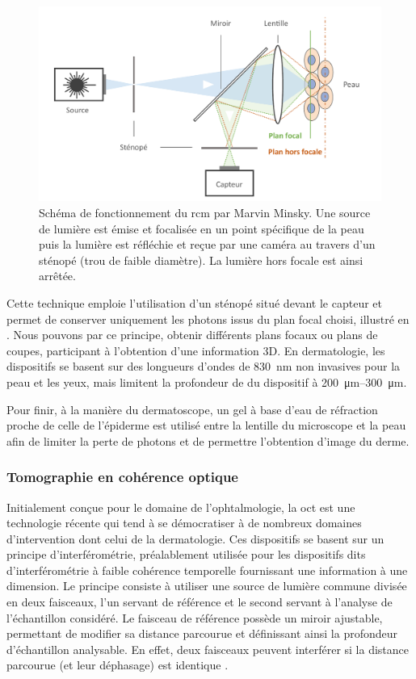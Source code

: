 \begin{figure}[H]
\centering
    \includegraphics[width=0.85\linewidth]{contents/chapter_2/resources/rcm_principle.pdf}
    \caption{Schéma de fonctionnement du \gls{rcm} par Marvin Minsky. Une source de lumière est émise et focalisée en un point spécifique de la peau puis la lumière est réfléchie et reçue par une caméra au travers d'un sténopé (trou de faible diamètre). La lumière hors focale est ainsi arrêtée.}
    \label{fig:rcm_principle}
\end{figure}\par

Cette technique emploie l’utilisation d’un sténopé situé devant le capteur et permet de conserver uniquement les photons issus du plan focal choisi, illustré en . Nous pouvons par ce principe, obtenir différents plans focaux ou plans de coupes, participant à l’obtention d’une information 3D. En dermatologie, les dispositifs se basent sur des longueurs d’ondes de \SI{830}{\nano\metre} non invasives pour la peau et les yeux, mais limitent la profondeur de du dispositif à \SIrange{200}{300}{\micro\metre}.\par

Pour finir, à la manière du dermatoscope, un gel à base d’eau de réfraction proche de celle de l’épiderme est utilisé entre la lentille du microscope et la peau afin de limiter la perte de photons et de permettre l’obtention d’image du derme.\par

\subsubsection{Tomographie en cohérence optique}
Initialement conçue pour le domaine de l’ophtalmologie, la \gls{oct} est une technologie récente qui tend à se démocratiser à de nombreux domaines d’intervention dont celui de la dermatologie. Ces dispositifs se basent sur un principe d’interférométrie, préalablement utilisée pour les dispositifs dits d’interférométrie à faible cohérence temporelle fournissant une information à une dimension. Le principe consiste à utiliser une source de lumière commune divisée en deux faisceaux, l’un servant de référence et le second servant à l’analyse de l’échantillon considéré. Le faisceau de référence possède un miroir ajustable, permettant de modifier sa distance parcourue et définissant ainsi la profondeur d’échantillon analysable. En effet, deux faisceaux peuvent interférer si la distance parcourue (et leur déphasage) est identique .\par

